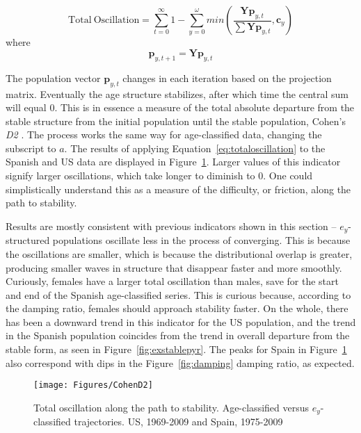 \begin{equation}
\label{eq:totaloscillation}
\mathrm{Total~Oscillation} = \sum _{t=0} ^\infty 1 - \sum _{y=0} ^\omega
min \left( \frac{\boldsymbol{Y} \boldsymbol{p}_{y,t}}{\sum \boldsymbol{Y}
\boldsymbol{p}_{y,t}}, \boldsymbol{c}_y \right)
\end{equation}
where
\begin{equation}
\boldsymbol{p}_{y,t+1} = \boldsymbol{Y} \boldsymbol{p}_{y,t}
\end{equation}

The population vector $\textbf{p}_{y,t}$ changes in each iteration based on the
projection matrix. Eventually the age structure stabilizes, after which time the central sum will
equal 0. This is in essence a measure of the total absolute departure from the
stable structure from the initial population until the stable population,
Cohen's \textit{D2} \citep{caswell2001matrix}. The process works the same way
for age-classified data, changing the subscript to $a$. The results of applying
Equation~\eqref{eq:totaloscillation} to the Spanish and US data are displayed
in Figure~\ref{fig:exCohenD2}. Larger values of this indicator signify larger
oscillations, which take longer to diminish to 0. One could
simplistically understand this as a measure of the difficulty, or friction,
along the path to stability.

Results are mostly consistent with previous indicators shown in this section --
$e_y$-structured populations oscillate less in the process of converging. This
is because the oscillations are smaller, which is because the distributional
overlap is greater, producing smaller waves in structure that disappear faster
and more smoothly. Curiously, females have a larger total oscillation than
males, save for the start and end of the Spanish age-classified series. This is
curious because, according to the damping ratio, females should approach
stability faster. On the whole, there has been a downward trend in this
indicator for the US population, and the trend in the Spanish population
coincides from the trend in overall departure from the stable form, as seen in
Figure~\ref{fig:exstablepyr}. The peaks for Spain in Figure~\ref{fig:exCohenD2}
also correspond with dips in the Figure~\ref{fig:damping} damping ratio, as
expected.

\begin{figure}[ht!]
       \centering
       \caption{Total oscillation along the path to
       stability. Age-classified versus $e_y$-classified trajectories. US,
       1969-2009 and Spain, 1975-2009}
        \texttt{[image: Figures/CohenD2]}
        \label{fig:exCohenD2}
\end{figure}

